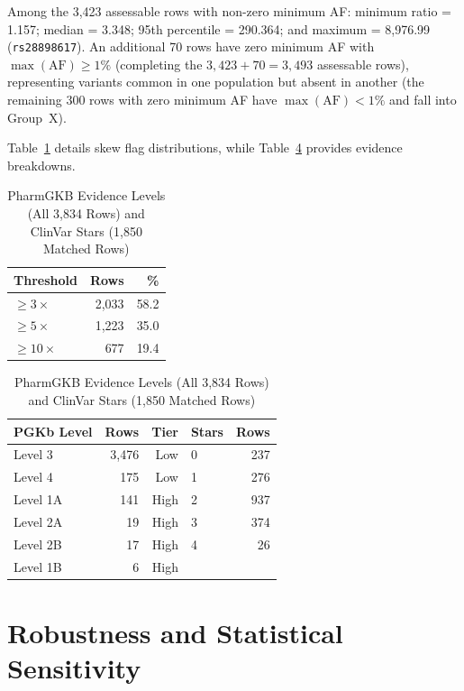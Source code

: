 \documentclass[conference]{IEEEtran}
\begin{document}
\begin{table}[!t]
Among the 3,423 assessable rows with non-zero minimum AF: minimum ratio = 1.157; median = 3.348; 95th percentile = 290.364; and maximum = 8,976.99 (\texttt{rs28898617}).
An additional 70 rows have zero minimum AF with $\max(\text{AF}) \ge 1\%$ (completing the $3{,}423 + 70 = 3{,}493$ assessable rows), representing variants common in one population but absent in another (the remaining 300 rows with zero minimum AF have $\max(\text{AF}) < 1\%$ and fall into Group~X).

Table~\ref{tab:skew-flags} details skew flag distributions, while Table~\ref{tab:evidence} provides evidence breakdowns.

\begin{table}[!t]
\centering
\caption{Skew Flags Among Assessable Rows ($n = 3{,}493$)}
\label{tab:skew-flags}
\renewcommand{\arraystretch}{1.15}
\begin{tabular}{|l|r|r|}
\hline
\textbf{Threshold} & \textbf{Rows} & \textbf{\%} \\
\hline
$\ge 3\times$ & 2,033 & 58.2 \\
\hline
$\ge 5\times$ & 1,223 & 35.0 \\
\hline
$\ge 10\times$ & 677 & 19.4 \\
\hline
\end{tabular}
\end{table}

\begin{table}[!t]
\centering
\caption{PharmGKB Evidence Levels (All 3,834 Rows) and ClinVar Stars (1,850 Matched Rows)}
\label{tab:evidence}
\renewcommand{\arraystretch}{1.15}
\begin{tabular}{|l|r|r||l|r|}
\hline
\textbf{PGKb Level} & \textbf{Rows} & \textbf{Tier} & \textbf{Stars} & \textbf{Rows} \\
\hline
Level 3  & 3,476 & Low  & 0 & 237 \\
\hline
Level 4  &   175 & Low  & 1 & 276 \\
\hline
Level 1A &   141 & High & 2 & 937 \\
\hline
Level 2A &    19 & High & 3 & 374 \\
\hline
Level 2B &    17 & High & 4 &  26 \\
\hline
Level 1B &     6 & High &   &     \\
\hline
\end{tabular}
\end{table}

\section{Robustness and Statistical Sensitivity}


\end{table}
\end{document}

